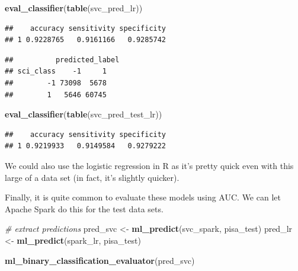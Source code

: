 \documentclass[]{book}
\newenvironment{Shaded}{\begin{snugshade}}{\end{snugshade}}
\newcommand{\CommentTok}[1]{\textcolor[rgb]{0.56,0.35,0.01}{\textit{#1}}}
\newcommand{\KeywordTok}[1]{\textcolor[rgb]{0.13,0.29,0.53}{\textbf{#1}}}
\newcommand{\NormalTok}[1]{#1}
\newcommand{\OperatorTok}[1]{\textcolor[rgb]{0.81,0.36,0.00}{\textbf{#1}}}
\newcommand{\StringTok}[1]{\textcolor[rgb]{0.31,0.60,0.02}{#1}}
\begin{document}
\begin{Shaded}
\begin{Highlighting}[]
\KeywordTok{eval_classifier}\NormalTok{(}\KeywordTok{table}\NormalTok{(svc_pred_lr))}
\end{Highlighting}
\end{Shaded}

\begin{verbatim}
##    accuracy sensitivity specificity
## 1 0.9228765   0.9161166   0.9285742
\end{verbatim}

\begin{Shaded}
\end{Shaded}

\begin{verbatim}
##          predicted_label
## sci_class    -1     1
##        -1 73098  5678
##        1   5646 60745
\end{verbatim}

\begin{Shaded}
\begin{Highlighting}[]
\KeywordTok{eval_classifier}\NormalTok{(}\KeywordTok{table}\NormalTok{(svc_pred_test_lr))}
\end{Highlighting}
\end{Shaded}

\begin{verbatim}
##    accuracy sensitivity specificity
## 1 0.9219933   0.9149584   0.9279222
\end{verbatim}

We could also use the logistic regression in R as it's pretty quick even with this large of a data set (in fact, it's slightly quicker).

Finally, it is quite common to evaluate these models using AUC. We can let Apache Spark do this for the test data sets.

\begin{Shaded}
\begin{Highlighting}[]
\CommentTok{# extract predictions}
\NormalTok{pred_svc <-}\StringTok{ }\KeywordTok{ml_predict}\NormalTok{(svc_spark, pisa_test)}
\NormalTok{pred_lr <-}\StringTok{ }\KeywordTok{ml_predict}\NormalTok{(spark_lr, pisa_test)}

\KeywordTok{ml_binary_classification_evaluator}\NormalTok{(pred_svc)}
\end{Highlighting}
\end{Shaded}
\end{document}
